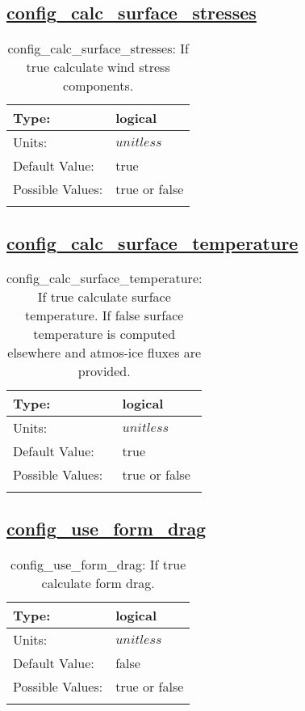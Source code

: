 \subsection[config\_calc\_surface\_stresses]{\hyperref[sec:nm_tab_atmosphere]{config\_calc\_surface\_stresses}}
\label{subsec:nm_sec_config_calc_surface_stresses}
\begin{center}
\begin{longtable}{| p{2.0in} || p{4.0in} |}
    \hline
    Type: & logical \\
    \hline
    Units: & $unitless$ \\
    \hline
    Default Value: & true \\
    \hline
    Possible Values: & true or false \\
    \hline
    \caption{config\_calc\_surface\_stresses: If true calculate wind stress components.}
\end{longtable}
\end{center}
\subsection[config\_calc\_surface\_temperature]{\hyperref[sec:nm_tab_atmosphere]{config\_calc\_surface\_temperature}}
\label{subsec:nm_sec_config_calc_surface_temperature}
\begin{center}
\begin{longtable}{| p{2.0in} || p{4.0in} |}
    \hline
    Type: & logical \\
    \hline
    Units: & $unitless$ \\
    \hline
    Default Value: & true \\
    \hline
    Possible Values: & true or false \\
    \hline
    \caption{config\_calc\_surface\_temperature: If true calculate surface temperature. If false surface temperature is computed elsewhere and atmos-ice fluxes are provided.}
\end{longtable}
\end{center}
\subsection[config\_use\_form\_drag]{\hyperref[sec:nm_tab_atmosphere]{config\_use\_form\_drag}}
\label{subsec:nm_sec_config_use_form_drag}
\begin{center}
\begin{longtable}{| p{2.0in} || p{4.0in} |}
    \hline
    Type: & logical \\
    \hline
    Units: & $unitless$ \\
    \hline
    Default Value: & false \\
    \hline
    Possible Values: & true or false \\
    \hline
    \caption{config\_use\_form\_drag: If true calculate form drag.}
\end{longtable}
\end{center}
